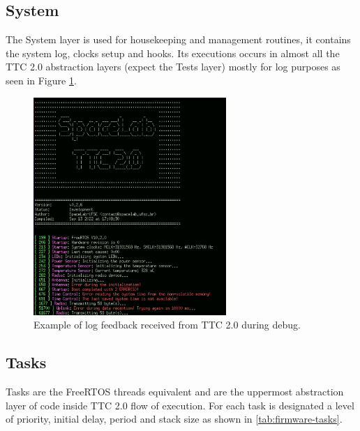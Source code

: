 \subsection{System}

The System layer is used for housekeeping and management routines, it contains the system log, clocks setup and hooks. Its executions occurs in almost all the TTC 2.0 abstraction layers (expect the Tests layer) mostly for log purposes as seen in Figure \ref{fig:log_info}.

\begin{figure}[!h]
	\begin{center}
		\includegraphics[width=0.65\textwidth]{figures/ttc2-terminal-log.png}
		\caption{Example of log feedback received from TTC 2.0 during debug.}
		\label{fig:log_info}
	\end{center}
\end{figure}

\subsection{Tasks}

Tasks are the FreeRTOS threads equivalent and are the uppermost abstraction layer of code inside TTC 2.0 flow of execution. For each task is designated a level of priority, initial delay, period and stack size as shown in \autoref{tab:firmware-tasks}.


